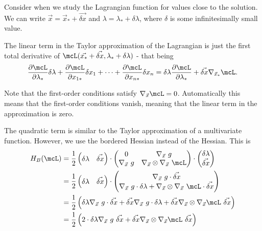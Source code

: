 \documentclass[a4paper, 12pt,oneside,openany]{book}
\begin{document}
Consider when we study the Lagrangian function for values close to the solution. We can write $\vec{x} = \vec{x}_* + \vec{\delta x}$ and $\lambda = \lambda_* + \delta \lambda$, where $\delta$ is some infinitesimally small value.

The linear term in the Taylor approximation of the Lagrangian is just the first total derivative of $\mcL(\vec{x_*}+\vec{\delta x}, \lambda_*+\delta\lambda)$ - that being $$\frac{\partial \mcL}{\partial \lambda_*} \delta\lambda + \frac{\partial \mcL}{\partial x_{1*}} \delta x_1 + \dots + \frac{\partial \mcL}{\partial x_{n*}} \delta x_n  = \delta \lambda \frac{\partial \mcL}{\partial \lambda_*} + \vec{\delta x} \nabla_{\vec{x}_*} \mcL.$$

Note that the first-order conditions satisfy $\nabla_{\vec{x}} \mcL =0$. Automatically this means that the first-order conditions vanish, meaning that the linear term in the approximation is zero. 

The quadratic term is similar to the Taylor approximation of a multivariate function. However, we use the bordered Hessian instead of the Hessian. This is \begin{align*}  H_B(\mcL) &= \frac{1}{2} \begin{pmatrix} \delta \lambda & \vec{\delta x}  \end{pmatrix} \cdot  \begin{pmatrix} 0 & \nabla_{\vec{x}}\ g \\ \nabla_{\vec{x}}\ g & \nabla_{\vec{x}} \otimes \nabla_{\vec{x}}\ \mcL \end{pmatrix} \cdot \begin{pmatrix} \delta \lambda \\ \vec{\delta x} \end{pmatrix} \\ &= \frac{1}{2} \begin{pmatrix} \delta \lambda & \vec{\delta x} \end{pmatrix} \cdot \begin{pmatrix} \nabla_{\vec{x}}\ g \cdot \vec{\delta x} \\ \nabla_{\vec{x}}\ g \cdot \delta \lambda + \nabla_{\vec{x}} \otimes \nabla_{\vec{x}}\ \mcL \cdot \vec{\delta x} \end{pmatrix} \\ &= \frac{1}{2} \left( \delta \lambda \nabla_{\vec{x}}\ g \cdot \vec{\delta x} +   \vec{\delta x} \nabla_{\vec{x}}\ g \cdot \delta \lambda + \vec{\delta x} \nabla_{\vec{x}} \otimes \nabla_{\vec{x}} \mcL \ \vec{\delta x} \right) \\ &= \frac{1}{2} \left(2\cdot  \delta \lambda \nabla_{\vec{x}}\ g\ \vec{\delta x} +\vec{\delta x} \nabla_{\vec{x}} \otimes \nabla_{\vec{x}} \mcL \ \vec{\delta x} \right) \end{align*}
\end{document}
